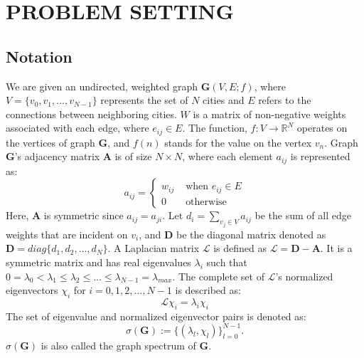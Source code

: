 \section{PROBLEM SETTING} \label{sec:problem}

\subsection{Notation}
\label{sec:notations}

We are given an undirected, weighted graph $\mathbf{G}(V,E;f)$, where $V=\{v_0,v_1,...,v_{N-1}\}$ represents the set of $N$ cities and $E$ refers to the connections between neighboring cities. $W$ is a matrix of non-negative weights associated with each edge, where $e_{ij}\in E$. The function, $f: V \rightarrow {\mathbb{R}}^N$ operates on the vertices of graph $\mathbf{G}$, and $f(n)$ stands for the value on the vertex $v_n$. Graph $\mathbf{G}$'s adjacency matrix $\mathbf{A}$ is of size $N\times N$, where each element $a_{ij}$ is represented as:
\begin{equation}
a_{ij} = \left\{ \begin{array}{rl}
 w_{ij} &\mbox{ when $e_{ij}\in {E}$} \\
  0 &\mbox{ otherwise}
       \end{array} \right.
\end{equation}
Here, $\mathbf{A}$ is symmetric since $a_{ij}=a_{ji}$.
Let $d_i=\sum\limits_{v_j \in V}a_{ij}$ be the sum of all edge weights that are incident on $v_i$, and $\mathbf{D}$ be the diagonal matrix denoted as $\mathbf{D}=diag\{d_1,d_2,\ldots,d_N\}$. A Laplacian matrix $\mathcal{L}$ is defined as $\mathcal{L}=\mathbf{D-A}$. It is a symmetric matrix and has real eigenvalues $\lambda_{i}$ such that $0 = \lambda_{0} < \lambda_{1} \leq \lambda_{2} \leq \ldots \leq \lambda_{N-1} = \lambda_{max}$. The complete set of $\mathcal{L}$'s normalized eigenvectors $\chi_{i}$ for $i=0,1,2,...,N-1$ is described as:
\begin{equation}
\label{eq:eigenvalues}
\mathcal{L}\chi_{i}=\lambda_{i}\chi_{i}
\end{equation}
The set of eigenvalue and normalized eigenvector pairs is denoted as:
\begin{equation}
\label{eq:spectrum}
\sigma({\mathbf{G}}):=\{(\lambda_l,\chi_l)\}_{l=0}^{N-1}.
\end{equation}$\sigma({\mathbf{G}})$ is also called the graph spectrum of $\mathbf{G}$.




